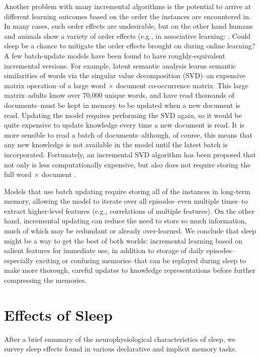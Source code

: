 \documentclass[10pt,letterpaper]{article}
\begin{document}
Another problem with many incremental algorithms is the potential to arrive at different learning outcomes based on the order the instances are encountered in. In many cases, such order effects are undesirable, but on the other hand humans and animals show a variety of order effects (e.g., in associative learning: . Could sleep be a chance to mitigate the order effects brought on during online learning? A few batch-update models have been found to have roughly-equivalent incremental versions. For example, latent semantic analysis \cite[LSA]{Deerwester:1990} learns semantic similarities of words via the singular value decomposition (SVD)--an expensive matrix operation--of a large word $\times$ document co-occurrence matrix. This large matrix--adults know over 70,000 unique words, and have read thousands of documents--must be kept in memory to be updated when a new document is read. Updating the model requires performing the SVD again, so it would be quite expensive to update knowledge every time a new document is read. It is more sensible to read a batch of documents--although, of course, this means that any new knowledge is not available in the model until the latest batch is incorporated. Fortunately, an incremental SVD algorithm has been proposed that not only is less computationally expensive, but also does not require storing the full word $\times$ document \cite{Sarwar:2002}.

Models that use batch updating require storing all of the instances in long-term memory, allowing the model to iterate over all episodes--even multiple times--to extract higher-level features (e.g., correlations of multiple features). On the other hand, incremental updating can reduce the need to store so much information, much of which may be redundant or already over-learned. We conclude that sleep might be a way to get the best of both worlds: incremental learning based on salient features for immediate use, in addition to storage of daily episodes--especially exciting or confusing memories--that can be replayed during sleep to make more thorough, careful updates to knowledge representations before further compressing the memories.

\vspace{-.1cm}
\section{Effects of Sleep}
\vspace{-.1cm}

After a brief summary of the neurophysiological characteristics of sleep, we survey sleep effects found in various declarative and implicit memory tasks.
\end{document}
